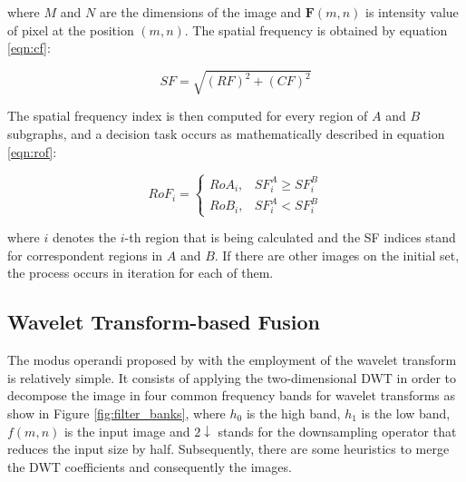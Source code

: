 \noindent where $M$ and $N$ are the dimensions of the image and $\mathbf{F}(m,n)$ is intensity value of pixel at the position $(m,n)$. The spatial frequency is obtained by equation \ref{eqn:cf}:

\begin{equation}
\label{eqn:sf}
    SF = \sqrt{(RF)^{2} + (CF)^{2}}
\end{equation}

The spatial frequency index is then computed for every region of $A$ and $B$ subgraphs, and a decision task occurs as mathematically described in equation \ref{eqn:rof}:

\begin{equation}
\label{eqn:rof}
    RoF_{i} = 
    \begin{cases}
        RoA_{i}, & SF_{i}^{A} \geq SF_{i}^{B}\\
        RoB_{i}, & SF_{i}^{A} < SF_{i}^{B}
    \end{cases}
\end{equation}

\noindent where $i$ denotes the $i$-th region that is being calculated and the SF indices stand for correspondent regions in $A$ and $B$. If there are other images on the initial set, the process occurs in iteration for each of them.

\subsection{Wavelet Transform-based Fusion}

The modus operandi proposed by  with the employment of the wavelet transform is relatively simple. It consists of applying the two-dimensional DWT in order to decompose the image in four common frequency bands for wavelet transforms as show in Figure \ref{fig:filter_banks}, where $h_{0}$ is the high band, $h_{1}$ is the low band, $f(m,n)$ is the input image and $2\downarrow$ stands for the downsampling operator that reduces the input size by half. Subsequently, there are some heuristics to merge the DWT coefficients and consequently the images.

